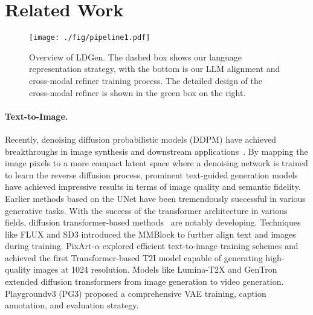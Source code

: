 \section{Related Work}
\begin{figure*}[t]
  \centering
  \texttt{[image: ./fig/pipeline1.pdf]}
\vspace{-1em}
  \caption{ Overview of LDGen. The dashed box shows our language representation strategy, with the bottom is our LLM alignment and cross-modal refiner training process. The detailed design of the cross-modal refiner is shown in the green box on the right.
  }
  \vspace{-1em}
  \label{fig:pipeline}
\end{figure*}

\paragraph{Text-to-Image.}

% 
Recently, denoising diffusion probabilistic models (DDPM) \cite{ho2020denoising,nichol2021improved} have achieved breakthroughs in image synthesis and downstream applications~\cite{zhang2023adding,zhou2024magictailor,li2024photomaker,wei2023elite,li2023layerdiffusion,li2024tuning,li2024pruning,feng2024dit4edit}. By mapping the image pixels to a more compact latent space where a denoising network is trained to learn the reverse diffusion process, prominent text-guided generation models have achieved impressive results in terms of image quality and semantic fidelity. Earlier methods \cite{rombach2022high, podell2023sdxl} based on the UNet have been tremendously successful in various generative tasks. With the success of the transformer architecture in various fields, diffusion transformer-based methods~\cite{peebles2023scalable,gao2023masked} are notably developing. Techniques like FLUX \cite{flux2024} and SD3 \cite{esser2024scaling} introduced the MMBlock to further align text and images during training. PixArt-$\alpha$ \cite{chen2023pixart} explored efficient text-to-image training schemes and achieved the first Transformer-based T2I model capable of generating high-quality images at 1024 resolution. Models like Lumina-T2X \cite{gao2024lumina} and GenTron \cite{chen2024gentron} extended diffusion transformers from image generation to video generation. Playgroundv3 (PG3) \cite{liu2024playground} proposed a comprehensive VAE training, caption annotation, and evaluation strategy. 



